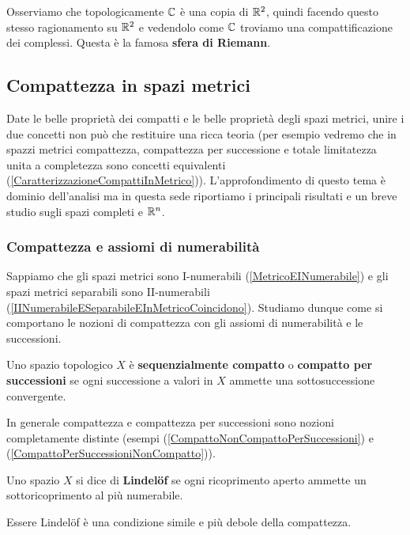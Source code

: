 \begin{multicols*}{2}
\begin{remark}
Osserviamo che topologicamente $\mathbb{C}$ è una copia di $\mathbb{R}^2$, quindi facendo questo stesso ragionamento su $\mathbb{R}^2$ e vedendolo come $\mathbb{C}$ troviamo una compattificazione dei complessi. Questa è la famosa \textbf{sfera di Riemann}.
\end{remark}




\subsection{Compattezza in spazi metrici}
Date le belle proprietà dei compatti e le belle proprietà degli spazi metrici, unire i due concetti non può che restituire una ricca teoria (per esempio vedremo che in spazzi metrici compattezza, compattezza per successione e totale limitatezza unita a completezza sono concetti equivalenti (\ref{CaratterizzazioneCompattiInMetrico})). L'approfondimento di questo tema è dominio dell'analisi ma in questa sede riportiamo i principali risultati e un breve studio sugli spazi completi e $\mathbb{R}^n$.

\subsubsection{Compattezza e assiomi di numerabilità}
Sappiamo che gli spazi metrici sono I-numerabili (\ref{MetricoEINumerabile}) e gli spazi metrici separabili sono II-numerabili (\ref{IINumerabileESeparabileEInMetricoCoincidono}). Studiamo dunque come si comportano le nozioni di compattezza con gli assiomi di numerabilità e le successioni.
\begin{definition}
Uno spazio topologico $X$ è \textbf{sequenzialmente compatto} o \textbf{compatto per successioni} se ogni successione a valori in $X$ ammette una sottosuccessione convergente.
\end{definition}

\begin{remark}
In generale compattezza e compattezza per successioni sono nozioni completamente distinte (esempi (\ref{CompattoNonCompattoPerSuccessioni}) e (\ref{CompattoPerSuccessioniNonCompatto})).
\end{remark}

\begin{definition}
Uno spazio $X$ si dice di \textbf{Lindel\"of} se ogni ricoprimento aperto ammette un sottoricoprimento al più numerabile.
\end{definition}
\begin{remark}
Essere Lindel\"of è una condizione simile e più debole della compattezza.
\end{remark}


\end{multicols*}

